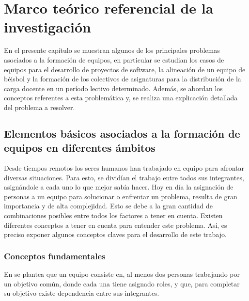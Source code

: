 \chapter{Marco teórico referencial de la investigación}\label{chap:1}

En el presente capítulo se muestran algunos de los principales problemas asociados a la formación de equipos, en particular se estudian los casos de equipos para el desarrollo de proyectos de software, la alineación de un equipo de béisbol y la formación de los colectivos de asignaturas para la distribución de la carga docente en un período lectivo determinado. Además, se abordan los conceptos referentes a esta problemática y, se realiza una explicación detallada del problema a resolver.

\section{Elementos básicos asociados a la formación de equipos en diferentes ámbitos}

Desde tiempos remotos los seres humanos han trabajado en equipo para afrontar diversas situaciones. Para esto, se dividían el trabajo entre todos sus integrantes, asignándole a cada uno lo que mejor sabía hacer. Hoy en día la asignación de personas a un equipo para solucionar o enfrentar un problema, resulta de gran importancia y de alta complejidad. Esto se debe a la gran cantidad de combinaciones posibles entre todos los factores a tener en cuenta. Existen diferentes conceptos a tener en cuenta para entender este problema. Así, es preciso exponer algunos conceptos claves para el desarrollo de este trabajo.

\subsection{Conceptos fundamentales}


En \cite{63} se plantea que un equipo consiste en, al menos dos personas trabajando por un objetivo común, donde cada una tiene asignado roles, y que, para completar su objetivo existe dependencia entre sus integrantes.\\

